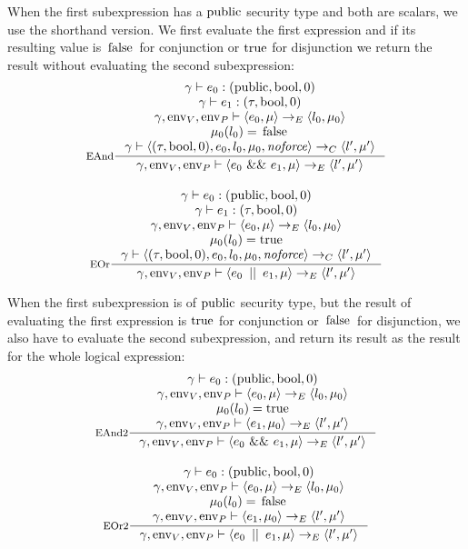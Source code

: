 \documentclass[a4paper, 10pt, draft]{report}
\DeclareMathOperator*{\env}{env}
\DeclareMathOperator*{\noforce}{\mathit{noforce}}
\newcommand{\mycode}[1]{\ensuremath{\mbox{\lstinline{#1}}}}
\begin{document}
When the first subexpression has a \mycode{public} security type and both are
scalars, we use the shorthand version. We first evaluate the first expression
and if its resulting value is \mycode{false} for conjunction or \mycode{true}
for disjunction we return the result without evaluating the second
subexpression:
\[\begin{array}{c}
\inference[EAnd]{
  \gamma |- e_0 : (\mycode{public}, \mycode{bool}, 0) \\
  \gamma |- e_1 : (\tau, \mycode{bool}, 0) \\
  \gamma, \env_V, \env_P |- \left<e_0, \mu \right> \to_E \left< l_0, \mu_0 \right> \\
  \mu_0(l_0) = \mycode{false} \\
  \gamma |- \left<  (\tau, \mycode{bool}, 0), e_0, l_0, \mu_0, \noforce \right> \to_C \left<l', \mu' \right>
}{
  \gamma, \env_V, \env_P |- \left<e_0\ \mycode{&&}\ e_1, \mu \right> \to_E \left<l', \mu' \right>
} \\[2em]
\inference[EOr]{
  \gamma |- e_0 : (\mycode{public}, \mycode{bool}, 0) \\
  \gamma |- e_1 : (\tau, \mycode{bool}, 0) \\
  \gamma, \env_V, \env_P |- \left<e_0, \mu \right> \to_E \left< l_0, \mu_0 \right> \\
  \mu_0(l_0) = \mycode{true} \\
  \gamma |- \left< (\tau, \mycode{bool}, 0), e_0, l_0, \mu_0, \noforce \right> \to_C \left<l', \mu' \right>
}{
  \gamma, \env_V, \env_P |- \left<e_0\ \mycode{||}\ e_1, \mu \right> \to_E \left<l', \mu' \right>
}
\end{array}\]

When the first subexpression is of \mycode{public} security type, but the
result of evaluating the first expression is \mycode{true} for conjunction or
\mycode{false} for disjunction, we also have to evaluate the second
subexpression, and return its result as the result for the whole logical
expression:
\[
\begin{array}{c}
\inference[EAnd2]{
  \gamma |- e_0 : (\mycode{public}, \mycode{bool}, 0) \\
  \gamma, \env_V, \env_P |- \left<e_0, \mu \right> \to_E \left< l_0, \mu_0 \right> \\
  \mu_0(l_0) = \mycode{true} \\
  \gamma, \env_V, \env_P |- \left<e_1, \mu_0 \right> \to_E \left< l', \mu' \right> \\
}{
  \gamma, \env_V, \env_P |- \left<e_0\ \mycode{&&}\ e_1, \mu \right> \to_E \left<l', \mu' \right>
} \\[2em]
\inference[EOr2]{
  \gamma |- e_0 : (\mycode{public}, \mycode{bool}, 0) \\
  \gamma, \env_V, \env_P |- \left<e_0, \mu \right> \to_E \left< l_0, \mu_0 \right> \\
  \mu_0(l_0) = \mycode{false} \\
  \gamma, \env_V, \env_P |- \left<e_1, \mu_0 \right> \to_E \left< l', \mu' \right> \\
}{
  \gamma, \env_V, \env_P |- \left<e_0\ \mycode{||}\ e_1, \mu \right> \to_E \left<l', \mu' \right>
}
\end{array}\]
\end{document}
